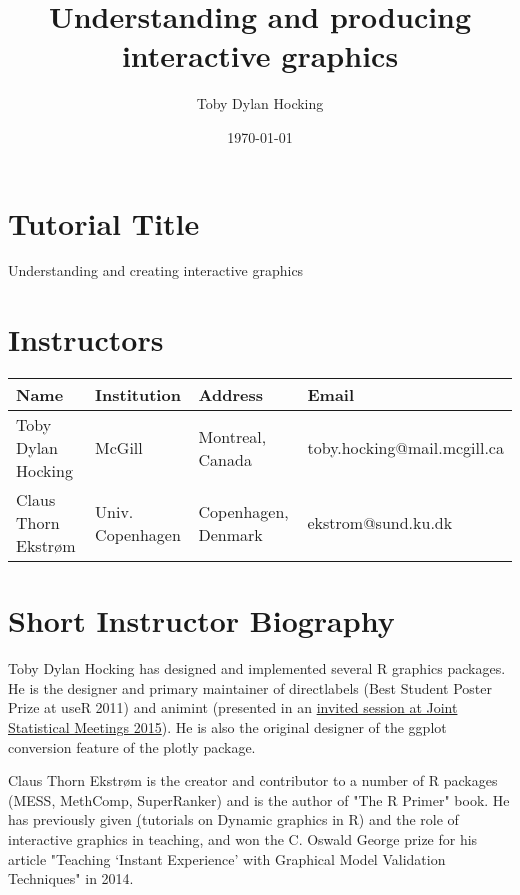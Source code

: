 \documentclass[11pt]{article}
\author{Toby Dylan Hocking}
\date{\today}
\title{Understanding and producing interactive graphics}
\begin{document}



\section{Tutorial Title}
\label{sec:orgheadline2}

Understanding and creating interactive graphics

\section{Instructors}
\label{sec:orgheadline3}

\begin{center}
\begin{tabular}{llll}
Name & Institution & Address & Email\\
\hline
Toby Dylan Hocking & McGill & Montreal, Canada & toby.hocking@mail.mcgill.ca\\
Claus Thorn Ekstrøm & Univ. Copenhagen & Copenhagen, Denmark & ekstrom@sund.ku.dk\\
\end{tabular}
\end{center}

\section{Short Instructor Biography}
\label{sec:orgheadline4}

Toby Dylan Hocking has designed and implemented several R graphics
packages. He is the designer and primary maintainer of directlabels
(Best Student Poster Prize at useR 2011) and animint (presented in an
\href{https://www.amstat.org/meetings/jsm/2015/onlineprogram/AbstractDetails.cfm?abstractid=314184\%0A}{invited
  session at Joint Statistical Meetings 2015}). He is also the
original designer of the ggplot conversion feature of the plotly
package.

Claus Thorn Ekstrøm is the creator and contributor to a number of R
packages (MESS, MethComp, SuperRanker) and is the author of "The R
Primer" book. He has previously given
\href{http://biostatistics.dk/presentations/DynGraph.html}(tutorials
on Dynamic graphics in R) and the role of interactive graphics in
teaching, and won the C. Oswald George prize for his article "Teaching
‘Instant Experience’ with Graphical Model Validation Techniques" in
2014.
\end{document}
